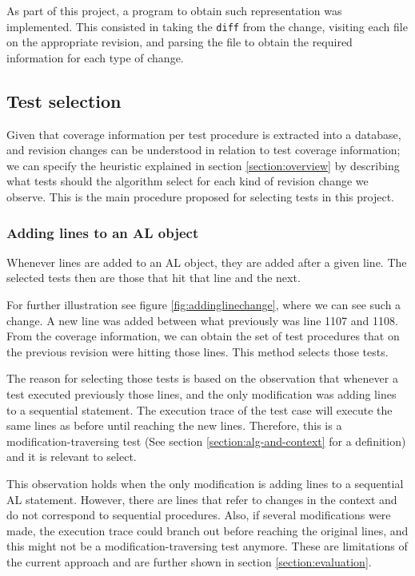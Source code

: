 \documentclass{article}
\begin{document}
As part of this project, a program to obtain such representation was implemented. This consisted in taking the \texttt{diff} from the change, visiting each file on the appropriate revision, and parsing the file to obtain the required information for each type of change.

\subsection{Test selection}\label{section:test-selection}

Given that coverage information per test procedure is extracted into a database, and revision changes can be understood in relation to test coverage information; we can specify the heuristic explained in section \ref{section:overview} by describing what tests should the algorithm select for each kind of revision change we observe. This is the main procedure proposed for selecting tests in this project.

\subsubsection{Adding lines to an AL object}
Whenever lines are added to an AL object, they are added after a given line. The selected tests then are those that hit that line and the next.

For further illustration see figure \ref{fig:addinglinechange}, where we can see such a change. A new line was added between what previously was line 1107 and 1108. From the coverage information, we can obtain the set of test procedures that on the previous revision were hitting those lines. This method selects those tests.

The reason for selecting those tests is based on the observation that whenever a test executed previously those lines, and the only modification was adding lines to a sequential statement. The execution trace of the test case will execute the same lines as before until reaching the new lines. Therefore, this is a modification-traversing test (See section \ref{section:alg-and-context} for a definition) and it is relevant to select.

This observation holds when the only modification is adding lines to a sequential AL statement. However, there are lines that refer to changes in the context and do not correspond to sequential procedures. Also, if several modifications were made, the execution trace could branch out before reaching the original lines, and this might not be a modification-traversing test anymore. These are limitations of the current approach and are further shown in section \ref{section:evaluation}.
\end{document}
